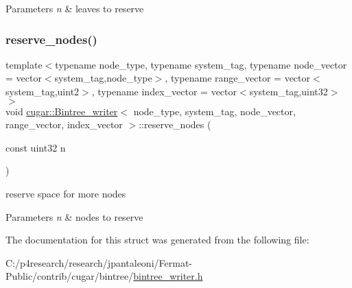 \begin{DoxyParams}{Parameters}
{\em n} & leaves to reserve \\
\hline
\end{DoxyParams}
\mbox{\label{structcugar_1_1_bintree__writer_a5c181a6cc8ee971fda6435d4d25ad089}} 
\subsubsection{\texorpdfstring{reserve\+\_\+nodes()}{reserve\_nodes()}}
{\footnotesize\ttfamily template$<$typename node\+\_\+type, typename system\+\_\+tag, typename node\+\_\+vector = vector$<$system\+\_\+tag,node\+\_\+type$>$, typename range\+\_\+vector = vector$<$system\+\_\+tag,uint2$>$, typename index\+\_\+vector = vector$<$system\+\_\+tag,uint32$>$$>$ \\
void \hyperlink{structcugar_1_1_bintree__writer}{cugar\+::\+Bintree\+\_\+writer}$<$ node\+\_\+type, system\+\_\+tag, node\+\_\+vector, range\+\_\+vector, index\+\_\+vector $>$\+::reserve\+\_\+nodes (\begin{DoxyParamCaption}\item[{const uint32}]{n }\end{DoxyParamCaption})\hspace{0.3cm}{\ttfamily [inline]}}

reserve space for more nodes


\begin{DoxyParams}{Parameters}
{\em n} & nodes to reserve \\
\hline
\end{DoxyParams}


The documentation for this struct was generated from the following file\+:\begin{DoxyCompactItemize}
\item 
C\+:/p4research/research/jpantaleoni/\+Fermat-\/\+Public/contrib/cugar/bintree/\hyperlink{bintree__writer_8h}{bintree\+\_\+writer.\+h}\end{DoxyCompactItemize}
